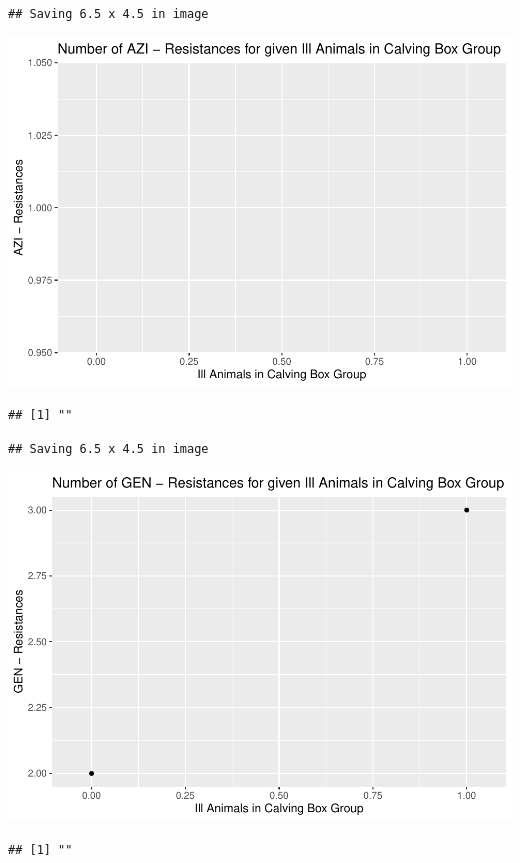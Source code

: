 \documentclass[
]{article}
\begin{document}
\begin{verbatim}
## Saving 6.5 x 4.5 in image
\end{verbatim}

\includegraphics{NResistenzen_files/figure-latex/binary_or_nominal_variables-23.pdf}

\begin{verbatim}
## [1] ""
\end{verbatim}

\begin{verbatim}
## Saving 6.5 x 4.5 in image
\end{verbatim}

\includegraphics{NResistenzen_files/figure-latex/binary_or_nominal_variables-24.pdf}

\begin{verbatim}
## [1] ""
\end{verbatim}
\end{document}
